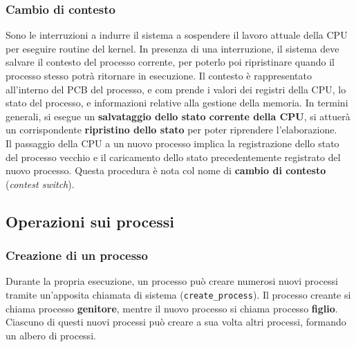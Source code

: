 \documentclass[11pt,a4paper]{article}
\begin{document}
\subsubsection{Cambio di contesto}
Sono le interruzioni a indurre il sistema a sospendere il
lavoro attuale della CPU per eseguire routine del kernel. In presenza di una interruzione, il sistema deve salvare il
contesto del processo corrente, per poterlo poi ripristinare quando il processo stesso potrà
ritornare in esecuzione. Il contesto è rappresentato all'interno del PCB del processo, e com­
prende i valori dei registri della CPU, lo stato del processo, e informa­zioni relative alla gestione della memoria. In termini generali, si esegue un \textbf{salvataggio dello
stato corrente della CPU}, si attuerà un corrispondente \textbf{ripristino dello stato} per poter riprendere l'elaborazio­ne.\medskip\\
Il passaggio della CPU a un nuovo processo implica la registrazione dello stato del pro­cesso vecchio e il caricamento dello stato precedentemente registrato del nuovo processo.
Questa procedura è nota col nome di \textbf{cambio di contesto} (\emph{contest switch}).

\subsection{Operazioni sui processi}
\subsubsection{Creazione di un processo}
Durante la propria esecuzione, un processo può creare numerosi nuovi processi tramite
un'apposita chiamata di sistema (\texttt{create\_process}). Il processo creante si chiama proces­so \textbf{genitore}, mentre il nuovo processo si chiama processo \textbf{figlio}. Ciascuno di questi nuovi
processi può creare a sua volta altri processi, formando un albero di processi.
\end{document}
